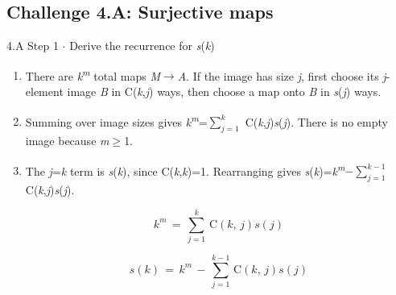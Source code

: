\documentclass[11pt]{article}
\begin{document}
\begin{keepsection}\subsection{Challenge 4.A: Surjective maps}

\begin{workedbox}{4.A Step 1 \ensuremath{\cdot} Derive the recurrence for \textit{s}(\textit{k})}
\begin{enumerate}
\item There are \textit{k}\textsuperscript{\textit{m}} total maps \textit{M}\ensuremath{\to}\textit{A}. If the image has size \textit{j}, first choose its \textit{j}-element image \textit{B} in C(\textit{k},\textit{j}) ways, then choose a map onto \textit{B} in \textit{s}(\textit{j}) ways.
\item Summing over image sizes gives \textit{k}\textsuperscript{\textit{m}}=$\sum_{{j}=1}^{{k}} $ C(\textit{k},\textit{j})\textit{s}(\textit{j}). There is no empty image because \textit{m}\ensuremath{\geq}1.
\item {}
The \textit{j}=\textit{k} term is \textit{s}(\textit{k}), since C(\textit{k},\textit{k})=1. Rearranging gives \textit{s}(\textit{k})=\textit{k}\textsuperscript{\textit{m}}\ensuremath{-}$\sum_{{j}=1}^{{k}-1} $ C(\textit{k},\textit{j})\textit{s}(\textit{j}).

\begin{equation*}{k}^{{m}}\, =\, \sum_{{j}=1}^{{k}} \, \mathrm{C}({k},\, {j}){s}({j})\end{equation*}

\begin{equation*}{s}({k})\, =\, {k}^{{m}}\, -\, \sum_{{j}=1}^{{k}-1} \, \mathrm{C}({k},\, {j}){s}({j})\end{equation*}
\end{enumerate}
\end{workedbox}

\end{keepsection}
\end{document}
